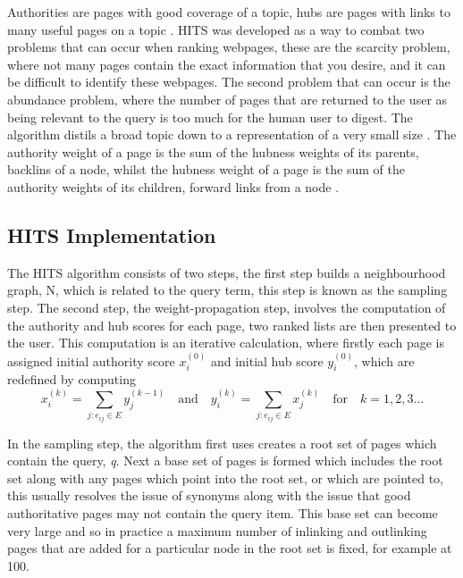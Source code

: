 \documentclass[11pt]{report}
\newcommand{\myequations}[1]{%
\addcontentsline{equ}{myequations}{\protect\numberline{\theequation}#1}\par}
\begin{document}
Authorities are pages with good coverage of a topic, hubs are pages with links to many useful pages on a topic \cite{bonato}. HITS was developed as a way to combat two problems that can occur when ranking webpages, these are the scarcity problem, where not many pages contain the exact information that you desire, and it can be difficult to identify these webpages. The second problem that can occur is the abundance problem, where the number of pages that are returned to the user as being relevant to the query is too much for the human user to digest. The algorithm distils a broad topic down to a representation of a very small size \cite{kleinberg1999authoritative}. The authority weight of a page is the sum of the hubness weights of its parents, backlins of a node, whilst the hubness weight of a page is the sum of the authority weights of its children, forward links from a node \cite{baldi2003modeling}.

\subsection{HITS Implementation} \label{sec:HITS implementation}
The HITS algorithm consists of two steps, the first step builds a neighbourhood graph, N, which is related to the query term, this step is known as the sampling step. The second step, the weight-propagation step, involves the computation of the authority and hub scores for each page, two ranked lists are then presented to the user. This computation is an iterative calculation, where firstly each page is assigned initial authority score $x_i^{(0)}$ and initial hub score $y_i^{(0)}$, which are redefined by computing \begin{equation} \label{eq:HITS1}
x_i^{(k)} = \displaystyle \sum_{j:e_{ij}\in E} y_j^{(k-1)} \quad\mathrm{and}\quad y_i^{(k)} = \displaystyle \sum_{j:e_{ij}\in E} x_j^{(k)}  \quad\mathrm{for}\quad k=1,2,3\ldots
\end{equation} \myequations{HITS equations}

In the sampling step, the algorithm first uses creates a root set of pages which contain the query, \textit{q}. Next a base set of pages is formed which includes the root set along with any pages which point into the root set, or which are pointed to, this usually resolves the issue of synonyms along with the issue that good authoritative pages may not contain the query item. This base set can become very large and so in practice a maximum number of inlinking and outlinking pages that are added for a particular node in the root set is fixed, for example at 100. 
\end{document}
